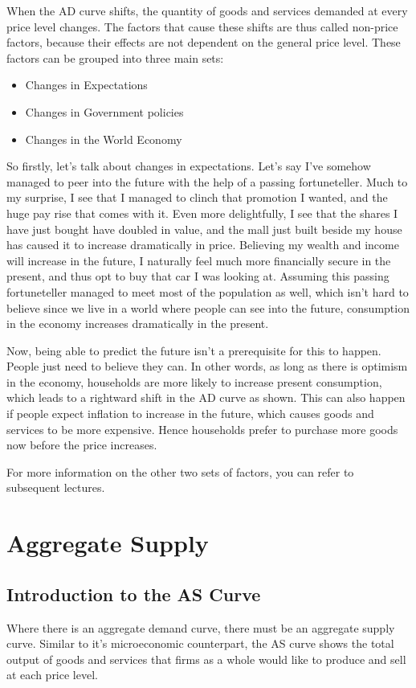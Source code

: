 When the AD curve shifts, the quantity of goods and services demanded at every price level changes. The factors that cause these shifts are thus called non-price factors, because their effects are not dependent on the general price level. These factors can be grouped into three main sets:
\begin{itemize}
\item Changes in Expectations
\item Changes in Government policies
\item Changes in the World Economy
\end{itemize}
So firstly, let’s talk about changes in expectations. Let’s say I’ve somehow managed to peer into the future with the help of a passing fortuneteller. Much to my surprise, I see that I managed to clinch that promotion I wanted, and the huge pay rise that comes with it. Even more delightfully, I see that the shares I have just bought have doubled in value, and the mall just built beside my house has caused it to increase dramatically in price. Believing my wealth and income will increase in the future, I naturally feel much more financially secure in the present, and thus opt to buy that car I was looking at. Assuming this passing fortuneteller managed to meet most of the population as well, which isn’t hard to believe since we live in a world where people can see into the future, consumption in the economy increases dramatically in the present. 

Now, being able to predict the future isn’t a prerequisite for this to happen. People just need to believe they can. In other words, as long as there is optimism in the economy, households are more likely to increase present consumption, which leads to a rightward shift in the AD curve as shown. This can also happen if people expect inflation to increase in the future, which causes goods and services to be more expensive. Hence households prefer to purchase more goods now before the price increases.

For more information on the other two sets of factors, you can refer to subsequent lectures.
\section{Aggregate Supply}
\subsection{Introduction to the AS Curve}
Where there is an aggregate demand curve, there must be an aggregate supply curve. Similar to it’s microeconomic counterpart, the AS curve shows the total output of goods and services that firms as a whole would like to produce and sell at each price level. 

